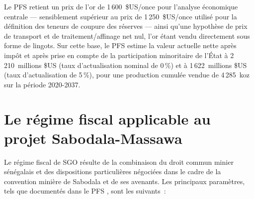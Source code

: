 Le PFS retient un prix de l'or de 1\,600~\$US/once pour l'analyse économique centrale --- sensiblement supérieur au prix de 1\,250~\$US/once utilisé pour la définition des teneurs de coupure des réserves --- ainsi qu'une hypothèse de prix de transport et de traitement/affinage net nul, l'or étant vendu directement sous forme de lingots. Sur cette base, le PFS estime la valeur actuelle nette après impôt et après prise en compte de la participation minoritaire de l'État à 2\,210~millions \$US (taux d'actualisation nominal de 0\,\%) et à 1\,622~millions \$US (taux d'actualisation de 5\,\%), pour une production cumulée vendue de 4\,285~koz sur la période 2020-2037.

\section{Le régime fiscal applicable au projet Sabodala-Massawa}
\label{sec:regime-sgo}

Le régime fiscal de SGO résulte de la combinaison du droit commun minier sénégalais et des dispositions particulières négociées dans le cadre de la convention minière de Sabodala et de ses avenants. Les principaux paramètres, tels que documentés dans le PFS \citep{lycopodium2020pfs}, sont les suivants~:


